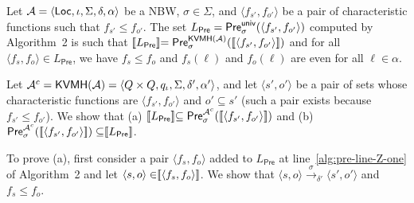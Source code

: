 \documentclass{LMCS}
\def\sg{\mathrel[\joinrel\mathrel[}
\def\sd{\mathrel]\joinrel\mathrel]}
\newcommand{\Pre}{\mathsf{Pre}}
\newcommand{\sem}[1]{\sg \mathrel{#1} \sd}
\renewcommand{\l}{{\ell}}
\newcommand{\Loc}{{\sf Loc}}
\newcommand{\tuple}[1]{\langle #1 \rangle}
\newcommand{\A}{\mathcal{A}}
\newcommand{\KVMH}{{\sf KVMH}}
\begin{document}
\begin{thm}\label{theo:correctness-alg-pre}
  Let $\A = \tuple{\Loc, \iota, \Sigma, \delta, \alpha}$ be a NBW, 
  $\sigma \in \Sigma$, and $\tuple{f_{s'},f_{o'}}$ be a pair of characteristic functions 
  such that $f_{s'} \leq f_{o'}$.
  The set $L_{\Pre} = \Pre^{{\sf univ}}_{\sigma}(\tuple{f_{s'},f_{o'}})$ computed by
  Algorithm~2 is such that 
  $\sem{L_{\Pre}} = \Pre^{\KVMH(\A)}_{\sigma}(\sem{\tuple{f_{s'},f_{o'}}})$
  and for all $\tuple{f_{s},f_{o}} \in L_{\Pre}$, we have $f_{s} \leq f_{o}$
  and $f_{s}(\l)$ and $f_{o}(\l)$ are even for all $\l \in \alpha$.
\end{thm} 

\proof 
Let $\A^c = \KVMH(\A) = \tuple{Q \times Q, q_{\iota}, \Sigma, \delta', \alpha'}$,
and let $\tuple{s',o'}$ be a pair of sets whose characteristic functions
are $\tuple{f_{s'},f_{o'}}$ and $o'\subseteq s'$ (such a pair exists because
$f_{s'} \leq f_{o'}$).
We show that (a) $\sem{L_{\Pre}} \subseteq \Pre^{\A^c}_{\sigma}(\sem{\tuple{f_{s'},f_{o'}}})$ and
(b) $\Pre^{\A^c}_{\sigma}(\sem{\tuple{f_{s'},f_{o'}}}) \subseteq \sem{L_{\Pre}}$.

To prove (a), first consider a pair $\tuple{f_s,f_o}$ added to $L_{\Pre}$ at 
line~\ref{alg:pre-line-Z-one} of Algorithm~2 and let 
$\tuple{s,o} \in \sem{\tuple{f_s,f_o}}$. We show that 
$\tuple{s,o} \xrightarrow{\sigma}_{\delta'} \tuple{s',o'}$ and $f_s \leq f_o$.
\end{document}
